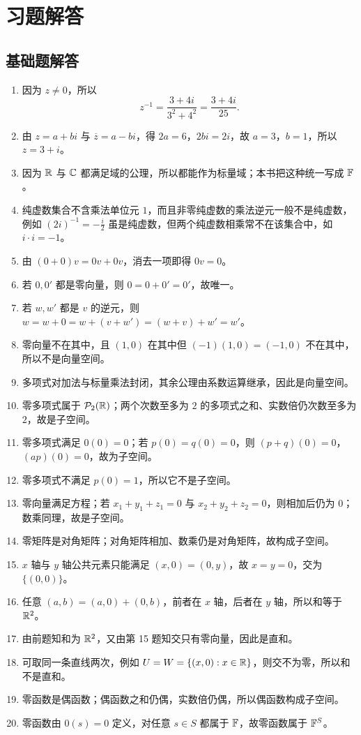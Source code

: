 \section*{习题解答}

\subsection*{基础题解答} \begin{enumerate}[label=\textbf{\arabic*.}]
\item 因为 $z\neq 0$，所以 \[
z^{-1}=\frac{3+4i}{3^2+4^2}=\frac{3+4i}{25}. \]
\item 由 $z=a+bi$ 与 $\overline z=a-bi$，得 $2a=6$，$2bi=2i$，故 $a=3$，$b=1$，所以 $z=3+i$。 \item 因为 $\mathbb{R}$ 与 $\mathbb{C}$ 都满足域的公理，所以都能作为标量域；本书把这种统一写成 $\mathbb{F}$。
\item 纯虚数集合不含乘法单位元 $1$，而且非零纯虚数的乘法逆元一般不是纯虚数，例如 $(2i)^{-1}=-\tfrac i2$ 虽是纯虚数，但两个纯虚数相乘常不在该集合中，如 $i\cdot i=-1$。 \item 由 $(0+0)v=0v+0v$，消去一项即得 $0v=0$。
\item 若 $0,0'$ 都是零向量，则 $0=0+0'=0'$，故唯一。 \item 若 $w,w'$ 都是 $v$ 的逆元，则 $w=w+0=w+(v+w')=(w+v)+w'=w'$。
\item 零向量不在其中，且 $(1,0)$ 在其中但 $(-1)(1,0)=(-1,0)$ 不在其中，所以不是向量空间。 \item 多项式对加法与标量乘法封闭，其余公理由系数运算继承，因此是向量空间。
\item 零多项式属于 $\mathcal{P}_2(\mathbb{R})$；两个次数至多为 $2$ 的多项式之和、实数倍仍次数至多为 $2$，故是子空间。 \item 零多项式满足 $0(0)=0$；若 $p(0)=q(0)=0$，则 $(p+q)(0)=0$，$(ap)(0)=0$，故为子空间。
\item 零多项式不满足 $p(0)=1$，所以它不是子空间。 \item 零向量满足方程；若 $x_1+y_1+z_1=0$ 与 $x_2+y_2+z_2=0$，则相加后仍为 $0$；数乘同理，故是子空间。
\item 零矩阵是对角矩阵；对角矩阵相加、数乘仍是对角矩阵，故构成子空间。 \item $x$ 轴与 $y$ 轴公共元素只能满足 $(x,0)=(0,y)$，故 $x=y=0$，交为 $\{(0,0)\}$。
\item 任意 $(a,b)=(a,0)+(0,b)$，前者在 $x$ 轴，后者在 $y$ 轴，所以和等于 $\mathbb{R}^2$。 \item 由前题知和为 $\mathbb{R}^2$，又由第 15 题知交只有零向量，因此是直和。
\item 可取同一条直线两次，例如 $U=W=\{(x,0):x\in\mathbb{R}\}$，则交不为零，所以和不是直和。 \item 零函数是偶函数；偶函数之和仍偶，实数倍仍偶，所以偶函数构成子空间。
\item 零函数由 $0(s)=0$ 定义，对任意 $s\in S$ 都属于 $\mathbb{F}$，故零函数属于 $\mathbb{F}^S$。 \end{enumerate}

